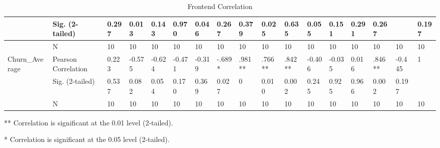 \documentclass[UKenglish]{ifimaster}  %
\begin{document}
\begin{table}[!htbp]
\begin{adjustwidth}{-2.5cm}{}
{\begin{tabular}{ | l | l | l | l | l | l | l | l | l | l | l | l | l | l | l | l | l | }
	 & Sig. (2-tailed) & 0.297 & 0.013 & 0.143 & 0.970 & 0.046 & 0.267 & 0.379 & 0.025 & 0.635 & 0.055 & 0.151 & 0.291 & 0.267 &  & 0.197\\ \hline
	 & N & 10 & 10 & 10 & 10 & 10 & 10 & 10 & 10 & 10 & 10 & 10 & 10 & 10 & 10 & 10 \\ \hline
	Churn\_Average & Pearson Correlation & 0.223 & -0.575 & -0.624 & -0.471 & -0.319 & -.689* & .981** & .766** & .842** & -0.406 & -0.035 & 0.016 & .846** & -0.445 & 1 \\ \hline
	 & Sig. (2-tailed) & 0.537 & 0.082 & 0.054 & 0.170 & 0.369 & 0.027 & 0 & 0.010 & 0.002 & 0.245 & 0.925 & 0.966 & 0.002 & 0.197 &  \\ \hline
	 & N & 10 & 10 & 10 & 10 & 10 & 10 & 10 & 10 & 10 & 10 & 10 & 10 & 10 & 10 & 10 \\ \hline
\end{tabular}
    }
       \centerline{  ** Correlation is significant at the 0.01 level (2-tailed).}
    \centerline {* Correlation is significant at the 0.05 level (2-tailed).}
      \caption{Frontend Correlation}
   \end{adjustwidth}
\end{table}%
\end{document}
